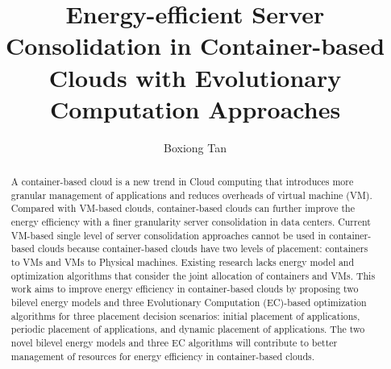 \documentclass[11pt
              , a4paper
              , twoside
              , openright
              ]{report}
\title{Energy-efficient Server Consolidation in Container-based Clouds with Evolutionary Computation Approaches}
\author{Boxiong Tan}
\date{}
\begin{document}



\begin{abstract}
\small
A container-based cloud is a new trend in Cloud computing that introduces more granular management of applications and reduces overheads of virtual machine (VM).  Compared with VM-based clouds, container-based clouds can further improve the energy efficiency with a finer granularity server consolidation in data centers. Current VM-based single level of server consolidation approaches cannot be used in container-based clouds because container-based clouds have two levels of placement: containers to VMs and VMs to Physical machines. Existing research lacks energy model and optimization algorithms that consider the joint allocation of containers and VMs. 
This work aims to improve energy efficiency in container-based clouds by proposing two bilevel energy models and three Evolutionary Computation (EC)-based optimization algorithms for three placement decision scenarios: initial placement of applications, periodic placement of applications, and dynamic placement of applications. The two novel bilevel energy models and three EC algorithms will contribute to better management of resources for energy efficiency in container-based clouds. 


\end{abstract}


\maketitle

% 

\tableofcontents



\mainmatter









\backmatter



%


\end{document}
